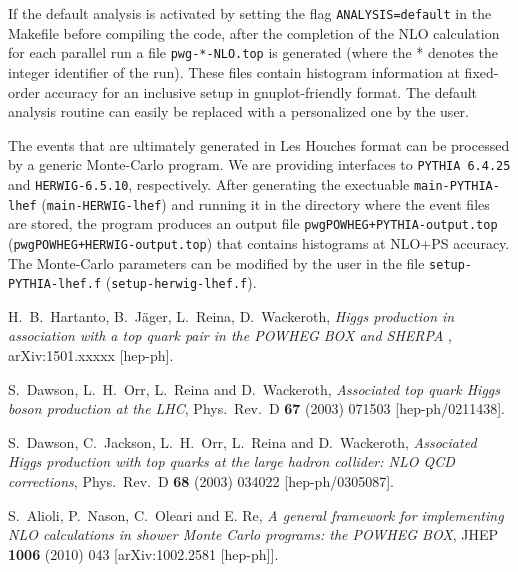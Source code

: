 \documentclass[a4paper,11pt]{article}
\newcommand\PYTHIA{{\tt PYTHIA}}
\begin{document}
If the default analysis is activated by setting the flag 
{\tt ANALYSIS=default} in the Makefile before compiling the code, after the completion of the NLO calculation for each parallel run a file {\tt  pwg-*-NLO.top} is generated (where the * denotes the integer
identifier of the run). These files contain histogram information at fixed-order accuracy for an inclusive setup in gnuplot-friendly format. The default analysis routine can easily be replaced with a personalized one by the user.  

The events that are ultimately generated in Les Houches format can be processed by a generic Monte-Carlo program. We are providing interfaces to \PYTHIA~{\tt 6.4.25}  and {\tt HERWIG-6.5.10}, respectively. After generating the exectuable {\tt main-PYTHIA-lhef} ({\tt main-HERWIG-lhef}) and running it in the directory where the event files are stored, the program produces an output file {\tt pwgPOWHEG+PYTHIA-output.top} ({\tt pwgPOWHEG+HERWIG-output.top}) that contains histograms at NLO+PS accuracy. The Monte-Carlo parameters can be modified by the user in the file {\tt setup-PYTHIA-lhef.f} ({\tt setup-herwig-lhef.f}). 

%
\begin{thebibliography}{99}

 H.~B.~Hartanto, B.~J\"ager, L.~Reina, D.~Wackeroth, {\em Higgs production in association with a top quark pair in the POWHEG BOX and SHERPA }, arXiv:1501.xxxxx [hep-ph]. 

  S.~Dawson, L.~H.~Orr, L.~Reina and D.~Wackeroth,
  {\em Associated top quark Higgs boson production at the LHC},
  Phys.\ Rev.\ D {\bf 67} (2003) 071503
  [hep-ph/0211438]. 
  
  S.~Dawson, C.~Jackson, L.~H.~Orr, L.~Reina and D.~Wackeroth,
  {\em Associated Higgs production with top quarks at the large hadron collider: NLO QCD corrections}, 
  Phys.\ Rev.\ D {\bf 68} (2003) 034022
  [hep-ph/0305087].

 S.~Alioli, P.~Nason, C.~Oleari and E. Re, {\em
    A general framework for implementing NLO calculations in shower
    Monte Carlo programs: the POWHEG BOX}, JHEP {\bf 1006} (2010)
  043  [arXiv:1002.2581 [hep-ph]].

\end{thebibliography}
\end{document}
